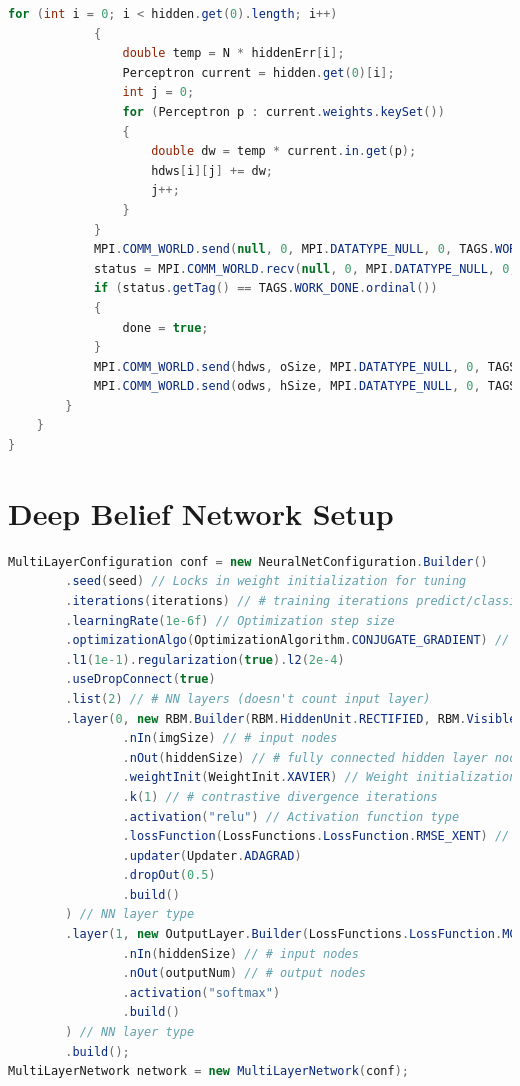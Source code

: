 \documentclass[10pt]{IEEEtran}
\newcommand{\?}{\stackrel{?}{=}}
\begin{document}
\begin{appendices}
\begin{lstlisting}[language=Java]
            for (int i = 0; i < hidden.get(0).length; i++)
            {
                double temp = N * hiddenErr[i];
                Perceptron current = hidden.get(0)[i];
                int j = 0;
                for (Perceptron p : current.weights.keySet())
                {
                    double dw = temp * current.in.get(p);
                    hdws[i][j] += dw;
                    j++;
                }
            }
            MPI.COMM_WORLD.send(null, 0, MPI.DATATYPE_NULL, 0, TAGS.WORK_DONE.ordinal());
            status = MPI.COMM_WORLD.recv(null, 0, MPI.DATATYPE_NULL, 0, MPI.ANY_TAG);
            if (status.getTag() == TAGS.WORK_DONE.ordinal())
            {
                done = true;
            }
            MPI.COMM_WORLD.send(hdws, oSize, MPI.DATATYPE_NULL, 0, TAGS.WORK_DONE.ordinal());
            MPI.COMM_WORLD.send(odws, hSize, MPI.DATATYPE_NULL, 0, TAGS.WORK_DONE.ordinal());
        }
    }
}

\end{lstlisting}
\section{Deep Belief Network Setup}\label{App:AppendixB}
\label{appendix:dbn}
\begin{lstlisting}[language=Java]
MultiLayerConfiguration conf = new NeuralNetConfiguration.Builder()
        .seed(seed) // Locks in weight initialization for tuning
        .iterations(iterations) // # training iterations predict/classify & backprop
        .learningRate(1e-6f) // Optimization step size
        .optimizationAlgo(OptimizationAlgorithm.CONJUGATE_GRADIENT) // Backprop to calculate gradients
        .l1(1e-1).regularization(true).l2(2e-4)
        .useDropConnect(true)
        .list(2) // # NN layers (doesn't count input layer)
        .layer(0, new RBM.Builder(RBM.HiddenUnit.RECTIFIED, RBM.VisibleUnit.GAUSSIAN)
                .nIn(imgSize) // # input nodes
                .nOut(hiddenSize) // # fully connected hidden layer nodes. Add list if multiple layers.
                .weightInit(WeightInit.XAVIER) // Weight initialization
                .k(1) // # contrastive divergence iterations
                .activation("relu") // Activation function type
                .lossFunction(LossFunctions.LossFunction.RMSE_XENT) // Loss function type
                .updater(Updater.ADAGRAD)
                .dropOut(0.5)
                .build()
        ) // NN layer type
        .layer(1, new OutputLayer.Builder(LossFunctions.LossFunction.MCXENT)
                .nIn(hiddenSize) // # input nodes
                .nOut(outputNum) // # output nodes
                .activation("softmax")
                .build()
        ) // NN layer type
        .build();
MultiLayerNetwork network = new MultiLayerNetwork(conf);

\end{lstlisting}

\end{appendices}
\end{document}
